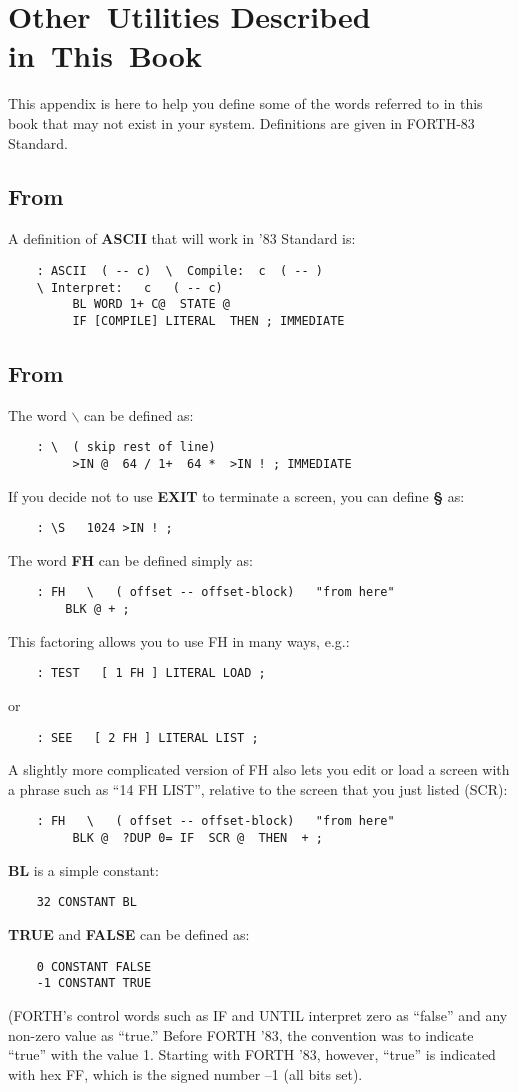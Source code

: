 \chapter{Other~Utilities
Described
in~This~Book}
This appendix is here to help you define some of the words referred to in 
this book that may not exist in your system.  Definitions are given in
FORTH-83 Standard.
\section{From }
A definition of {\bf ASCII} that will work in '83 Standard is:
\begin{verbatim}
    : ASCII  ( -- c)  \  Compile:  c  ( -- )
    \ Interpret:   c   ( -- c)
         BL WORD 1+ C@  STATE @
         IF [COMPILE] LITERAL  THEN ; IMMEDIATE
\end{verbatim}
\section{From }
The word {\bf $\backslash$} can be defined as:
\begin{verbatim}
    : \  ( skip rest of line)
         >IN @  64 / 1+  64 *  >IN ! ; IMMEDIATE
\end{verbatim}
If you decide not to use {\bf EXIT} to terminate a screen, you can define {\bf \S}
as:
\begin{verbatim}
    : \S   1024 >IN ! ;
\end{verbatim}
The word {\bf FH} can be defined simply as:
\begin{verbatim}
    : FH   \   ( offset -- offset-block)   "from here"
        BLK @ + ;
\end{verbatim}
This factoring allows you to use FH in many ways, e.g.:
\begin{verbatim}
    : TEST   [ 1 FH ] LITERAL LOAD ;
\end{verbatim}
or
\begin{verbatim}
    : SEE   [ 2 FH ] LITERAL LIST ;
\end{verbatim}
A slightly more complicated version of FH also lets you edit or load a 
screen with a phrase such as ``14 FH LIST'', relative to the screen that 
you just listed (SCR):
\begin{verbatim}
    : FH   \   ( offset -- offset-block)   "from here"
         BLK @  ?DUP 0= IF  SCR @  THEN  + ;
\end{verbatim}
{\bf BL} is a simple constant:
\begin{verbatim}
    32 CONSTANT BL
\end{verbatim}
{\bf TRUE} and {\bf FALSE} can be defined as:
\begin{verbatim}
    0 CONSTANT FALSE
    -1 CONSTANT TRUE
\end{verbatim}
(FORTH's control words such as IF and UNTIL interpret zero as ``false'' 
and any non-zero value as ``true.''  Before FORTH '83, the convention
was to indicate ``true'' with the value 1.  Starting with FORTH '83,
however, ``true'' is indicated with hex FF, which is the signed number --1
(all bits set).

